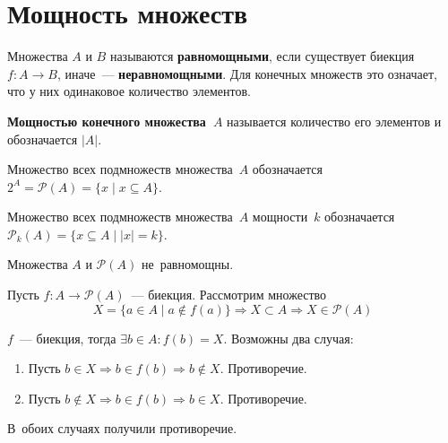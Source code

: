 \section{Мощность множеств}
Множества $A$ и $B$ называются \textbf{равномощными}, если существует биекция~$f \colon A \to B$, иначе~--- \textbf{неравномощными}.
Для конечных множеств это означает, что у них одинаковое количество элементов.

 \textbf{Мощностью конечного множества~$A$} называется количество его элементов и обозначается $|A|$.

Множество всех подмножеств множества~$A$ обозначается $2^A = \mathcal P(A) = \{ x \mid x \subseteq A \}$.

Множество всех подмножеств множества~$A$ мощности~$k$ обозначается $\mathcal P_k(A) = \{ x \subseteq A \mid |x| = k \}$.

\begin{theorem}[Кантора]
Множества $A$ и $\mathcal P(A)$ не~равномощны.
\end{theorem}
\begin{proofcontra}
Пусть $f \colon A \to \mathcal P(A)$~--- биекция. Рассмотрим множество
\begin{equation*}
X = \{ a \in A \mid a \notin f(a) \} \Rightarrow X \subset A \Rightarrow X \in \mathcal P(A)
\end{equation*}

$f$~--- биекция, тогда $\exists b \in A \colon f(b) = X$.
Возможны два случая:
\begin{enumerate}
	\item Пусть $b \in X \Rightarrow b \in f(b) \Rightarrow b \notin X$.
	Противоречие.
	\item Пусть $b \notin X \Rightarrow b \in f(b) \Rightarrow b \in X$.
	Противоречие.
\end{enumerate}

В~обоих случаях получили противоречие.
\end{proofcontra}

